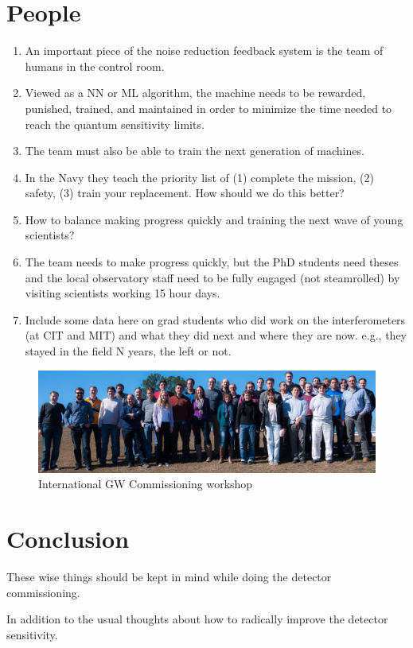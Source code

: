 \section{People}
\begin{enumerate}
\item An important piece of the noise reduction feedback system 
  is the team of humans in the control room.
\item Viewed as a NN or ML algorithm, the machine needs to be 
  rewarded, punished, trained, and maintained in order to minimize 
  the time needed to reach the quantum sensitivity limits.
\item The team must also be able to train the next generation of machines.
\item In the Navy they teach the priority list of (1) complete the mission, 
  (2) safety, (3) train your replacement. How should we do this better?
\item How to balance making progress quickly and training the next 
  wave of young scientists?
\item The team needs to make progress quickly, but the PhD 
  students need theses and the local observatory staff need to 
  be fully engaged (not steamrolled) by visiting scientists 
  working 15 hour days.
\item Include some data here on grad students who did work on the
  interferometers (at CIT and MIT) and what they did next and where
  they are now. e.g., they stayed in the field N years, the left or not.
\end{enumerate}

\begin{figure}[h]
\centering
\includegraphics[width=\columnwidth]{Figures/GroupPhoto_LLOworkshop13.jpg}
\caption{International GW Commissioning workshop}
\label{fig:workshopPhotoLLO}
\end{figure}

\section{Conclusion}
These wise things should be kept in mind while doing the detector commissioning.

In addition to the usual thoughts about how to radically improve the detector sensitivity.



